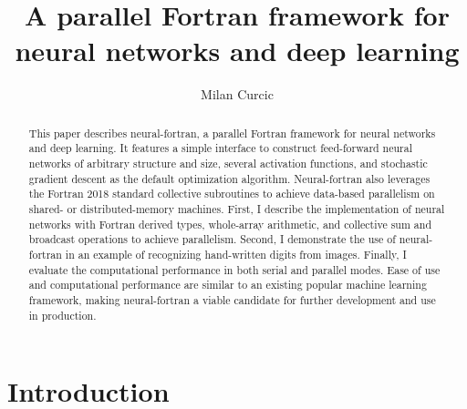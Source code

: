 \documentclass[sigplan, review=false, screen=true, balance=true]{acmart}
\begin{document}
\title{A parallel Fortran framework for neural networks and deep learning}

\author{Milan Curcic}

\begin{abstract}
This paper describes neural-fortran, a parallel Fortran framework for neural
networks and deep learning. It features a simple interface to construct
feed-forward neural networks of arbitrary structure and size, several activation
functions, and stochastic gradient descent as the default optimization algorithm.
Neural-fortran also leverages the Fortran 2018 standard collective subroutines
to achieve data-based parallelism on shared- or distributed-memory machines.
First, I describe the implementation of neural networks with Fortran derived
types, whole-array arithmetic, and collective sum and broadcast operations
to achieve parallelism. Second, I demonstrate the use of neural-fortran in an
example of recognizing hand-written digits from images. Finally, I evaluate
the computational performance in both serial and parallel modes. Ease of use and
computational performance are similar to an existing popular machine learning
framework, making neural-fortran a viable candidate for further development and
use in production.
\end{abstract}


\maketitle

\section{Introduction}
\end{document}

